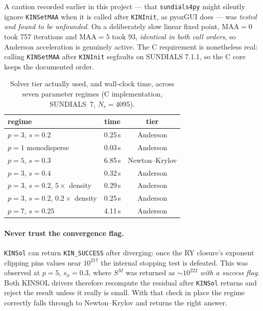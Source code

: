\documentclass[11pt,a4paper]{article}
\newcommand{\code}[1]{\texttt{#1}}
\begin{document}
A caution recorded earlier in this project --- that
\code{sundials4py} might silently ignore \code{KINSetMAA} when it is called
after \code{KINInit}, as pyozGUI does --- was \emph{tested and found to be
unfounded}. On a deliberately slow linear fixed point, MAA${}=0$ took 757
iterations and MAA${}=5$ took 93, \emph{identical in both call orders}, so
Anderson acceleration is genuinely active. The C requirement is nonetheless
real: calling \code{KINSetMAA} after \code{KINInit} segfaults on SUNDIALS
7.1.1, so the C core keeps the documented order.

\begin{table}[htbp]
\centering
\caption{Solver tier actually used, and wall-clock time, across seven
parameter regimes (C implementation, SUNDIALS~7, $N_r=4095$).}
\label{tab:tiers}
\begin{tabular}{lcc}
\toprule
regime & time & tier\\
\midrule
$p=3$, $s=0.2$              & 0.25\,s & Anderson\\
$p=1$ monodisperse          & 0.03\,s & Anderson\\
$p=5$, $s=0.3$              & 6.85\,s & Newton--Krylov\\
$p=3$, $s=0.4$              & 0.32\,s & Anderson\\
$p=3$, $s=0.2$, $5\times$ density   & 0.29\,s & Anderson\\
$p=3$, $s=0.2$, $0.2\times$ density & 0.25\,s & Anderson\\
$p=7$, $s=0.25$             & 4.11\,s & Anderson\\
\bottomrule
\end{tabular}
\end{table}

\paragraph{Never trust the convergence flag.} \code{KINSol} can return
\code{KIN\_SUCCESS} after diverging: once the RY closure's exponent clipping
pins values near $10^{217}$ the internal stopping test is defeated. This was
observed at $p=5$, $s_\sigma=0.3$, where $S^M$ was returned as
$\sim10^{222}$ \emph{with a success flag}. Both KINSOL drivers therefore
recompute the residual after \code{KINSol} returns and reject the result
unless it really is small. With that check in place the regime correctly falls
through to Newton--Krylov and returns the right answer.

\end{document}
